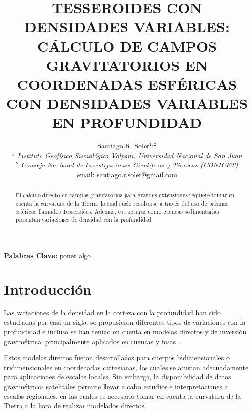 \documentclass[a4paper,10pt]{article}
\title{
    \textbf{
    TESSEROIDES CON DENSIDADES VARIABLES:
    CÁLCULO DE CAMPOS GRAVITATORIOS EN COORDENADAS ESFÉRICAS CON
    DENSIDADES VARIABLES EN PROFUNDIDAD
    }
}
\author{
    Santiago R. Soler$^{1,2}$ \vspace{0.5em} \\ 
    \textit{$^1$ Instituto Geofísico Sismológico Volponi, Universidad Nacional de San Juan} \\
    \textit{$^2$ Consejo Nacional de Investigaciones Científicas y Técnicas (CONICET)} \vspace{0.4em} \\
    email: santiago.r.soler@gmail.com
}
\date{}
\begin{document}
\renewcommand{\tablename}{Tabla}

\maketitle

\vspace{-2.5em}
\begin{center}
\textbf{Palabras Clave:} poner algo
\end{center}
\vspace{0.5em}

\begin{abstract}
El cálculo directo de campos gravitatorios para grandes extensiones requiere tomar en cuenta la curvatura de la Tierra, lo cual suele resolverse a través del uso de prismas esféricos llamados Tesseroides. Además, estructuras como cuencas sedimentarias presentan variaciones de densidad con la profundidad.

\end{abstract}


\section{Introducción}

Las variaciones de la densidad en la corteza con la profundidad han sido estudiadas por casi un siglo: se propusieron diferentes tipos de variaciones con la profundidad \citep{Athy1930, Maxant1980, Rao1986, Rao1993, Rao1994} e incluso se han tenido en cuenta en modelos directos y de inversión gravimétrica, principalmente aplicados en cuencas y fosas \citep{Cordell1973, Rao1986, Cowie1990, Rao1993, Rao1994, Zhang2001, Welford2010}.

Estos modelos directos fueron desarrollados para cuerpos bidimensionales o tridimensionales en coordenadas cartesianas, los cuales se ajustan adecuadamente para aplicaciones de escalas locales.
Sin embargo, la disponibilidad de datos gravimétricos satelitales permite llevar a cabo estudios e interpretaciones a escalas regionales, en las cuales es necesario tomar en cuenta la curvatura de la Tierra a la hora de realizar modelados directos. 
\end{document}
